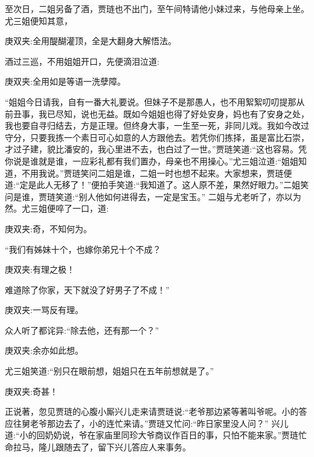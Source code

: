 \begin{parag}
    至次日，二姐另备了酒，贾琏也不出门，至午间特请他小妹过来，与他母亲上坐。尤三姐便知其意，\begin{note}庚双夹:全用醍醐灌顶，全是大翻身大解悟法。\end{note}酒过三巡，不用姐姐开口，先便滴泪泣道:\begin{note}庚双夹:全用如是等语一洗孽障。\end{note}“姐姐今日请我，自有一番大礼要说。但妹子不是那愚人，也不用絮絮叨叨提那从前丑事，我已尽知，说也无益。既如今姐姐也得了好处安身，妈也有了安身之处，我也要自寻归结去，方是正理。但终身大事，一生至一死，非同儿戏。我如今改过守分，只要我拣一个素日可心如意的人方跟他去。若凭你们拣择，虽是富比石崇，才过子建，貌比潘安的，我心里进不去，也白过了一世。”贾琏笑道:“这也容易。凭你说是谁就是谁，一应彩礼都有我们置办，母亲也不用操心。”尤三姐泣道:“姐姐知道，不用我说。”贾琏笑问二姐是谁，二姐一时也想不起来。大家想来，贾琏便道:“定是此人无移了！”便拍手笑道:“我知道了。这人原不差，果然好眼力。”二姐笑问是谁，贾琏笑道:“别人他如何进得去，一定是宝玉。” 二姐与尤老听了，亦以为然。尤三姐便啐了一口，道:\begin{note}庚双夹:奇，不知何为。\end{note}“我们有姊妹十个，也嫁你弟兄十个不成？\begin{note}庚双夹:有理之极！\end{note}难道除了你家，天下就没了好男子了不成！”\begin{note}庚双夹:一骂反有理。\end{note}众人听了都诧异:“除去他，还有那一个？”\begin{note}庚双夹:余亦如此想。\end{note}尤三姐笑道:“别只在眼前想，姐姐只在五年前想就是了。”\begin{note}庚双夹:奇甚！\end{note}
\end{parag}


\begin{parag}
    正说著，忽见贾琏的心腹小厮兴儿走来请贾琏说:“老爷那边紧等著叫爷呢。小的答应往舅老爷那边去了，小的连忙来请。”贾琏又忙问:“昨日家里没人问？” 兴儿道:“小的回奶奶说，爷在家庙里同珍大爷商议作百日的事，只怕不能来家。”贾琏忙命拉马，隆儿跟随去了，留下兴儿答应人来事务。
\end{parag}


